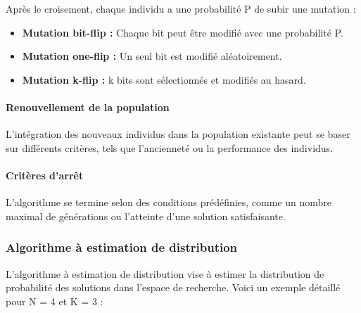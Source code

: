 \documentclass{article}
\begin{document}
Après le croisement, chaque individu a une probabilité P de subir une mutation :

\begin{itemize}
    \item \textbf{Mutation bit-flip :} Chaque bit peut être modifié avec une probabilité P.
    \item \textbf{Mutation one-flip :} Un seul bit est modifié aléatoirement.
    \item \textbf{Mutation k-flip :} k bits sont sélectionnés et modifiés au hasard.
\end{itemize}

\paragraph{Renouvellement de la population}

L'intégration des nouveaux individus dans la population existante peut se baser sur différents critères, tels que l'ancienneté ou la performance des individus.

\paragraph{Critères d'arrêt}

L'algorithme se termine selon des conditions prédéfinies, comme un nombre maximal de générations ou l'atteinte d'une solution satisfaisante.

\subsubsection{Algorithme à estimation de distribution}
L'algorithme à estimation de distribution vise à estimer la distribution de probabilité des solutions dans l'espace de recherche. Voici un exemple détaillé pour N = 4 et K = 3 :
\end{document}

